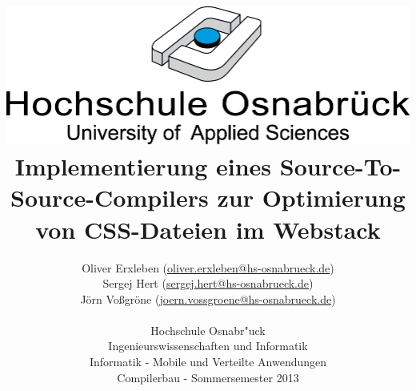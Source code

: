 \documentclass[11pt]{scrartcl}
\begin{document}
\author{%
	Oliver Erxleben \small(\href{mailto:oliver.erxleben@hs-osnabrueck.de}{oliver.erxleben@hs-osnabrueck.de})\\%
	Sergej Hert \small(\href{mailto:sergej.hert@hs-osnabrueck.de}{sergej.hert@hs-osnabrueck.de})\\%
	Jörn Voßgröne \small(\href{mailto:joern.vossgroene@hs-osnabrueck.de}{joern.vossgroene@hs-osnabrueck.de})\\
	\\%
	Hochschule Osnabr"uck \\%
	Ingenieurswissenschaften und Informatik \\%
	Informatik - Mobile und Verteilte Anwendungen\\
	Compilerbau - Sommersemester 2013 }

\title{\includegraphics[scale=0.75,keepaspectratio]{img/hs_os.png}\linebreak \linebreak Implementierung eines Source-To-Source-Compilers zur Optimierung von CSS-Dateien im Webstack}

\maketitle
\thispagestyle{empty}
\pagebreak
\tableofcontents
\listoffigures

\lstlistoflistings
\thispagestyle{empty}
\pagebreak
\thispagestyle{empty}
\end{document}
